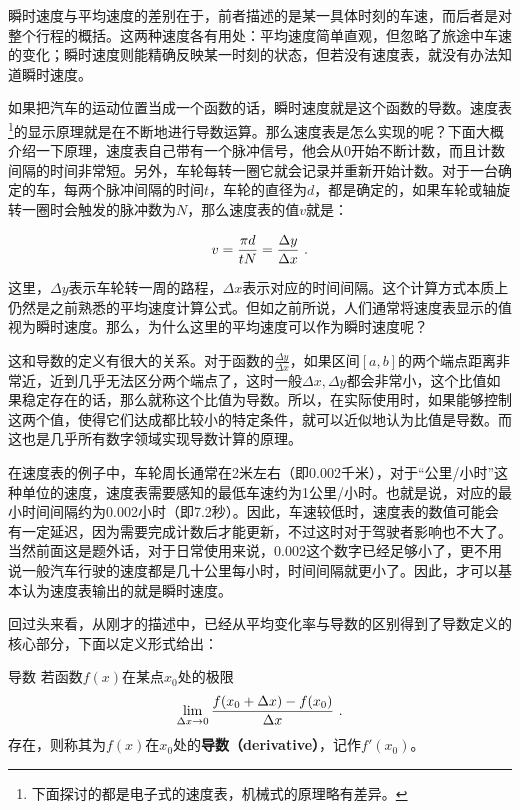 瞬时速度与平均速度的差别在于，前者描述的是某一具体时刻的车速，而后者是对整个行程的概括。这两种速度各有用处：平均速度简单直观，但忽略了旅途中车速的变化；瞬时速度则能精确反映某一时刻的状态，但若没有速度表，就没有办法知道瞬时速度。

如果把汽车的运动位置当成一个函数的话，瞬时速度就是这个函数的导数。速度表\footnote{下面探讨的都是电子式的速度表，机械式的原理略有差异。}的显示原理就是在不断地进行导数运算。那么速度表是怎么实现的呢？下面大概介绍一下原理，速度表自己带有一个脉冲信号，他会从0开始不断计数，而且计数间隔的时间非常短。另外，车轮每转一圈它就会记录并重新开始计数。对于一台确定的车，每两个脉冲间隔的时间$t$，车轮的直径为$d$，都是确定的，如果车轮或轴旋转一圈时会触发的脉冲数为$N$，那么速度表的值$v$就是：

\begin{equation}
v={\pi d\over tN}=\frac{\Delta y}{\Delta x}~.
\end{equation}

这里，$\Delta y$表示车轮转一周的路程，$\Delta x$表示对应的时间间隔。这个计算方式本质上仍然是之前熟悉的平均速度计算公式。但如之前所说，人们通常将速度表显示的值视为瞬时速度。那么，为什么这里的平均速度可以作为瞬时速度呢？

这和导数的定义有很大的关系。对于函数的$\displaystyle\frac{\Delta y}{\Delta x}$，如果区间$[a, b]$的两个端点距离非常近，近到几乎无法区分两个端点了，这时一般$\Delta x,\Delta y$都会非常小，这个比值如果稳定存在的话，那么就称这个比值为导数。所以，在实际使用时，如果能够控制这两个值，使得它们达成都比较小的特定条件，就可以近似地认为比值是导数。而这也是几乎所有数字领域实现导数计算的原理。

在速度表的例子中，车轮周长通常在2米左右（即0.002千米），对于“公里/小时”这种单位的速度，速度表需要感知的最低车速约为1公里/小时。也就是说，对应的最小时间间隔约为0.002小时（即7.2秒）。因此，车速较低时，速度表的数值可能会有一定延迟，因为需要完成计数后才能更新，不过这时对于驾驶者影响也不大了。当然前面这是题外话，对于日常使用来说，0.002这个数字已经足够小了，更不用说一般汽车行驶的速度都是几十公里每小时，时间间隔就更小了。因此，才可以基本认为速度表输出的就是瞬时速度。

回过头来看，从刚才的描述中，已经从平均变化率与导数的区别得到了导数定义的核心部分，下面以定义形式给出：

\begin{definition}{导数}
若函数$f(x)$在某点$x_0$处的极限
\begin{equation}
\lim_{\Delta x\to 0}{f(x_0+\Delta x)-f(x_0)\over \Delta x}~.
\end{equation}
存在，则称其为$f(x)$在$x_0$处的\textbf{导数（derivative）}，记作$f'(x_0)$。
\end{definition}

